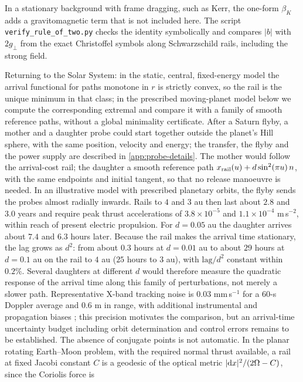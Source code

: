 \documentclass[12pt]{iopart}
\theoremstyle{plain}
\theoremstyle{definition}
\theoremstyle{remark}
\begin{document}
In a stationary background with frame dragging, such as Kerr, the one-form $\beta_K$ adds a
gravitomagnetic term that is not included here. The script
\texttt{verify\_rule\_of\_two.py} checks the identity symbolically and compares $|b|$ with
$2g_\perp$ from the exact Christoffel symbols along Schwarzschild rails, including the
strong field.

Returning to the Solar System: in the static, central, fixed-energy model
the arrival functional for paths monotone in $r$ is strictly convex, so the rail
is the unique minimum in that class; in the prescribed moving-planet model below
we compute the corresponding extremal and compare it with a family of smooth
reference paths, without a global minimality certificate. After a Saturn flyby, a mother and a daughter probe could start
together outside the planet's Hill sphere, with the same position, velocity
and energy; the transfer, the flyby and the power supply are described in
\ref{app:probe-details}. The mother would follow the arrival-cost rail; the daughter a
smooth reference path $x_{\rm rail}(u)+d\sin^2(\pi u)\,n$, with the same
endpoints and initial tangent, so that no release manoeuvre is needed. In an
illustrative model with prescribed planetary orbits, the flyby sends the probes almost
radially inwards. Rails to $4$ and $3$ au then last about $2.8$ and $3.0$ years and require
peak thrust accelerations of $3.8\times10^{-5}$ and $1.1\times10^{-4}$ m\,s$^{-2}$, within
reach of present electric propulsion. For $d=0.05$ au the daughter arrives about
$7.4$ and $6.3$ hours later. Because the rail makes the arrival time
stationary, the lag grows as $d^2$: from about $0.3$ hours at $d=0.01$ au to
about $29$ hours at $d=0.1$ au on the rail to $4$ au ($25$ hours to $3$ au), with $\mbox{lag}/d^2$ constant within
$0.2\%$. Several daughters at different $d$ would therefore measure the
quadratic response of the arrival time along this family of perturbations, not
merely a slower path. Representative X-band tracking noise is $0.03$ mm\,s$^{-1}$
for a 60-s Doppler average and $0.6$ m in range, with additional instrumental and
propagation biases \cite{ThorntonBorder2003}; this precision motivates the
comparison, but an arrival-time uncertainty budget including orbit
determination and control errors remains to be established. The absence of
conjugate points is not automatic. In the planar rotating Earth--Moon problem, with
the required normal thrust available, a rail at fixed Jacobi constant $C$ is a
geodesic of the optical metric $|{\rm d}x|^2/(2\Omega-C)$, since the Coriolis force is
\end{document}
